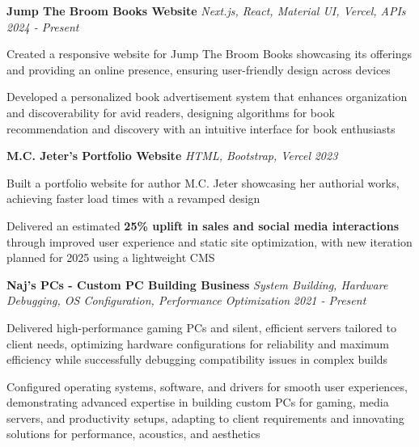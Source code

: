 \documentclass[letterpaper]{article}
\begin{document}
    {\textbf{Jump The Broom Books Website}} {\sl Next.js, React, Material UI, Vercel, APIs} \hfill \textsl{2024 - Present}\\
    \vspace{-2mm}
    \begin{tightitemize} \itemsep -1mm

        \item Created a responsive website for Jump The Broom Books showcasing its offerings and providing an online presence, ensuring user-friendly design across devices
        
        \item Developed a personalized book advertisement system that enhances organization and discoverability for avid readers, designing algorithms for book recommendation and discovery with an intuitive interface for book enthusiasts
        
    \end{tightitemize}
    \vspace{-2mm}

    {\textbf{M.C. Jeter's Portfolio Website}} {\sl HTML, Bootstrap, Vercel} \hfill \textsl{2023}\\
    \vspace{-2mm}
    \begin{tightitemize} \itemsep -1mm

        \item Built a portfolio website for author M.C. Jeter showcasing her authorial works, achieving faster load times with a revamped design
        
        \item Delivered an estimated \textbf{25\% uplift in sales and social media interactions} through improved user experience and static site optimization, with new iteration planned for 2025 using a lightweight CMS
        
    \end{tightitemize}
    \vspace{-2mm}

    {\textbf{Naj's PCs - Custom PC Building Business}} {\sl System Building, Hardware Debugging, OS Configuration, Performance Optimization} \hfill \textsl{2021 - Present}\\
    \vspace{-2mm}
    \begin{tightitemize} \itemsep -1mm

        \item Delivered high-performance gaming PCs and silent, efficient servers tailored to client needs, optimizing hardware configurations for reliability and maximum efficiency while successfully debugging compatibility issues in complex builds
        
        \item Configured operating systems, software, and drivers for smooth user experiences, demonstrating advanced expertise in building custom PCs for gaming, media servers, and productivity setups, adapting to client requirements and innovating solutions for performance, acoustics, and aesthetics
        
    \end{tightitemize}
    \vspace{-2mm}
\end{document}
